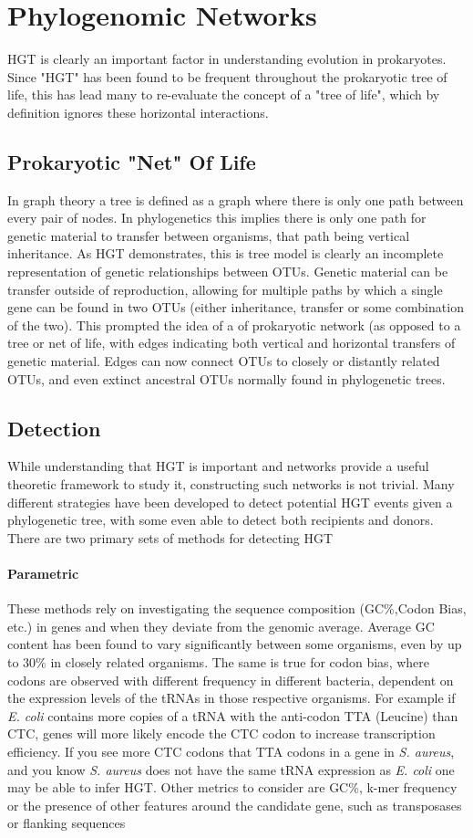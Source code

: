 \documentclass[12pt,letter]{article}
\begin{document}
\section{Phylogenomic Networks}
HGT is clearly an important factor in understanding evolution in prokaryotes.
Since "HGT" has been found to be frequent throughout the prokaryotic tree of life, this has lead many to re-evaluate the concept of a "tree of life", which by definition ignores these horizontal interactions.
\subsection{Prokaryotic "Net" Of Life}
In graph theory a tree is defined as a graph where there is only one path between every pair of nodes.
In phylogenetics this implies there is only one path for genetic material to transfer between organisms, that path being vertical inheritance.
As HGT demonstrates, this is tree model is clearly an incomplete representation of genetic relationships between OTUs.
Genetic material can be transfer outside of reproduction, allowing for multiple paths by which a single gene can be found in two OTUs (either inheritance, transfer or some combination of the two).
This prompted the idea of a of prokaryotic network (as opposed to a tree or net of life, with edges indicating both vertical and horizontal transfers of genetic material.
Edges can now connect OTUs to closely or distantly related OTUs, and even extinct ancestral OTUs normally found in phylogenetic trees.
\subsection{Detection}%
While understanding that HGT is important and networks provide a useful theoretic framework to study it, constructing such networks is not trivial.
Many different strategies have been developed to detect potential HGT events given a phylogenetic tree, with some even able to detect both recipients and donors.
There are two primary sets of methods for detecting HGT
\paragraph{Parametric}
These methods rely on investigating the sequence composition (GC\%,Codon Bias, etc.) in genes and when they deviate from the genomic average.
Average GC content has been found to vary significantly between some organisms, even by up to $30\%$ in closely related organisms.
The same is true for codon bias, where codons are observed with different frequency in different bacteria, dependent on the expression levels of the tRNAs in those respective organisms.
For example if \textit{E. coli} contains more copies of a tRNA with the anti-codon TTA (Leucine) than CTC, genes will more likely encode the CTC codon to increase transcription efficiency.
If you see more CTC codons that TTA codons in a gene in \textit{S. aureus}, and you know \textit{S. aureus} does not have the same tRNA expression as \textit{E. coli} one may be able to infer HGT.
Other metrics to consider are GC\%, k-mer frequency or the presence of other features around the candidate gene, such as transposases or flanking sequences
\end{document}

